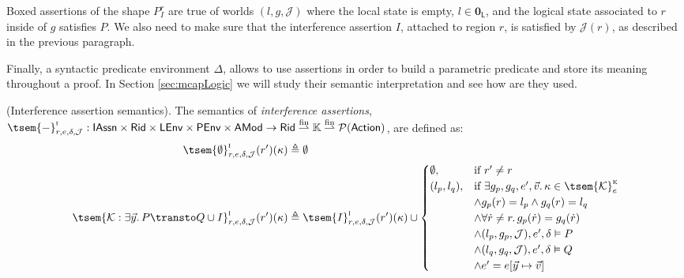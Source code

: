 Boxed assertions of the shape $\boxed{P}^r_I$ are true of worlds $(l, g, \mathcal{J})$ where the local state is empty, $l \in \mathbf{0}_\mathsf{L}$, and the logical state associated to $r$ inside of $g$ satisfies $P$. We also need to make sure that the interference assertion $I$, attached to region $r$, is satisfied by $\mathcal{J}(r)$, as described in the previous paragraph.

Finally, a syntactic predicate environment $\Delta$, allows to use assertions in order to build a parametric predicate and store its meaning throughout a proof. In Section \ref{sec:mcapLogic} we will study their semantic interpretation and see how are they used.

\begin{defn}
	\label{defn:interferenceSem}
	(Interference assertion semantics).
	The semantics of \emph{interference assertions}, $\tsem{-}^\textsc{i}_{r, e, \delta, \mathcal{J}} : \mathsf{IAssn} \times \mathsf{Rid} \times \mathsf{LEnv} \times \mathsf{PEnv} \times \mathsf{AMod} \rightarrow \mathsf{Rid} \overset{\text{fin}}{\rightharpoonup} \mathbb{K} \overset{\text{fin}}{\rightharpoonup} \mathcal{P}(\mathsf{Action})$, are defined as:
	\begin{align*}
		\tsem{\emptyset}^\textsc{i}_{r, e, \delta, \mathcal{J}}(r')(\kappa) &\triangleq \emptyset
		\\
		\tsem{\mathcal{K}: \exists \vec{y} \ldotp P \transto Q \cup I}^\textsc{i}_{r, e, \delta, \mathcal{J}}(r')(\kappa) &\triangleq
			\tsem{I}^\textsc{i}_{r, e, \delta, \mathcal{J}}(r')(\kappa)
			\cup 
			\begin{cases}
				\emptyset, & \text{if } r' \neq r
				\\
				(l_p, l_q), & \text{if } \exists g_p, g_q, e', \vec{v} \ldotp
				\kappa \in \tsem{\mathcal{K}}^\textsc{k}_e
				\\
				& \land g_p(r) = l_p \land g_q(r) = l_q
				\\
				& \land \forall \dot{r} \neq r \ldotp g_p(\dot{r}) = g_q(\dot{r})
				\\
				& \land (l_p, g_p, \mathcal{J}), e', \delta \vDash P
				\\
				& \land (l_q, g_q, \mathcal{J}), e', \delta \vDash Q
				\\
				& \land e' = e[\vec{y} \mapsto \vec{v}] 
			\end{cases}
	\end{align*}
\end{defn}
